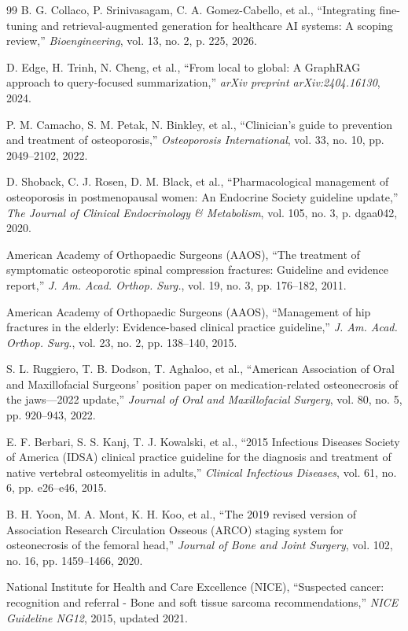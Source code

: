 \documentclass[12pt,a4paper]{article}
\begin{document}
\begin{thebibliography}{99}
B. G. Collaco, P. Srinivasagam, C. A. Gomez-Cabello, et al., ``Integrating fine-tuning and retrieval-augmented generation for healthcare AI systems: A scoping review,'' \textit{Bioengineering}, vol. 13, no. 2, p. 225, 2026.

D. Edge, H. Trinh, N. Cheng, et al., ``From local to global: A GraphRAG approach to query-focused summarization,'' \textit{arXiv preprint arXiv:2404.16130}, 2024.

P. M. Camacho, S. M. Petak, N. Binkley, et al., ``Clinician's guide to prevention and treatment of osteoporosis,'' \textit{Osteoporosis International}, vol. 33, no. 10, pp. 2049--2102, 2022.

D. Shoback, C. J. Rosen, D. M. Black, et al., ``Pharmacological management of osteoporosis in postmenopausal women: An Endocrine Society guideline update,'' \textit{The Journal of Clinical Endocrinology \& Metabolism}, vol. 105, no. 3, p. dgaa042, 2020.

American Academy of Orthopaedic Surgeons (AAOS), ``The treatment of symptomatic osteoporotic spinal compression fractures: Guideline and evidence report,'' \textit{J. Am. Acad. Orthop. Surg.}, vol. 19, no. 3, pp. 176--182, 2011.

American Academy of Orthopaedic Surgeons (AAOS), ``Management of hip fractures in the elderly: Evidence-based clinical practice guideline,'' \textit{J. Am. Acad. Orthop. Surg.}, vol. 23, no. 2, pp. 138--140, 2015.

S. L. Ruggiero, T. B. Dodson, T. Aghaloo, et al., ``American Association of Oral and Maxillofacial Surgeons' position paper on medication-related osteonecrosis of the jaws---2022 update,'' \textit{Journal of Oral and Maxillofacial Surgery}, vol. 80, no. 5, pp. 920--943, 2022.

E. F. Berbari, S. S. Kanj, T. J. Kowalski, et al., ``2015 Infectious Diseases Society of America (IDSA) clinical practice guideline for the diagnosis and treatment of native vertebral osteomyelitis in adults,'' \textit{Clinical Infectious Diseases}, vol. 61, no. 6, pp. e26--e46, 2015.

B. H. Yoon, M. A. Mont, K. H. Koo, et al., ``The 2019 revised version of Association Research Circulation Osseous (ARCO) staging system for osteonecrosis of the femoral head,'' \textit{Journal of Bone and Joint Surgery}, vol. 102, no. 16, pp. 1459--1466, 2020.

National Institute for Health and Care Excellence (NICE), ``Suspected cancer: recognition and referral - Bone and soft tissue sarcoma recommendations,'' \textit{NICE Guideline NG12}, 2015, updated 2021.

\end{thebibliography}
\end{document}
